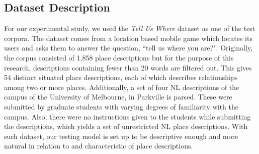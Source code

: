 \documentclass{acm_proc_article-sp}
\begin{document}
\subsection{Dataset Description}
For our experimental study, we used the \textit{Tell Us Where} dataset \cite{tuw} as one of the test corpora. The dataset comes from a location based mobile game which locates its users and asks them to answer the question, ``tell us where you are?". Originally, the corpus consisted of 1,858 place descriptions but for the purpose of this research, descriptions containing fewer than 20 words are filtered out. This gives 54 distinct situated place descriptions, each of which describes relationships among two or more places. Additionally, a set of four NL descriptions of the campus of the University of Melbourne, in Parkville is parsed. These were submitted by graduate students with varying degrees of familiarity with the campus. Also, there were no instructions given to the students while submitting the descriptions, which yields a set of unrestricted NL place descriptions.
With such dataset, our testing model is set up to be descriptive enough and more natural in relation to and characteristic of place descriptions. 
\end{document}
